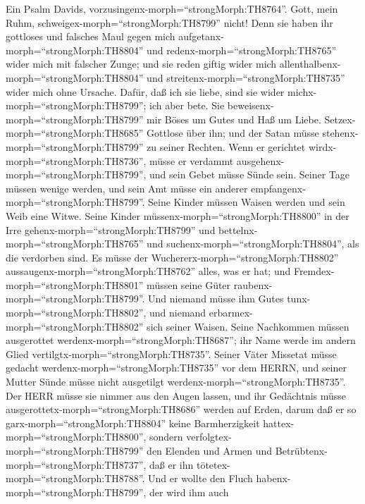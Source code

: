  Ein Psalm Davids,
vorzusingenx-morph=``strongMorph:TH8764''. Gott, mein Ruhm,
schweigex-morph=``strongMorph:TH8799'' nicht!  Denn sie
haben ihr gottloses und falsches Maul gegen mich
aufgetanx-morph=``strongMorph:TH8804'' und
redenx-morph=``strongMorph:TH8765'' wider mich mit falscher Zunge;
 und sie reden giftig wider mich
allenthalbenx-morph=``strongMorph:TH8804'' und
streitenx-morph=``strongMorph:TH8735'' wider mich ohne Ursache.
 Dafür, daß ich sie liebe, sind sie wider
michx-morph=``strongMorph:TH8799''; ich aber bete.  Sie
beweisenx-morph=``strongMorph:TH8799'' mir Böses um Gutes und Haß um
Liebe.  Setzex-morph=``strongMorph:TH8685'' Gottlose über
ihn; und der Satan müsse stehenx-morph=``strongMorph:TH8799'' zu seiner
Rechten.  Wenn er gerichtet
wirdx-morph=``strongMorph:TH8736'', müsse er verdammt
ausgehenx-morph=``strongMorph:TH8799'', und sein Gebet müsse Sünde sein.
 Seiner Tage müssen wenige werden, und sein Amt müsse ein
anderer empfangenx-morph=``strongMorph:TH8799''.  Seine
Kinder müssen Waisen werden und sein Weib eine Witwe. 
Seine Kinder müssenx-morph=``strongMorph:TH8800'' in der Irre
gehenx-morph=``strongMorph:TH8799'' und
bettelnx-morph=``strongMorph:TH8765'' und
suchenx-morph=``strongMorph:TH8804'', als die verdorben sind.
 Es müsse der Wuchererx-morph=``strongMorph:TH8802''
aussaugenx-morph=``strongMorph:TH8762'' alles, was er hat; und
Fremdex-morph=``strongMorph:TH8801'' müssen seine Güter
raubenx-morph=``strongMorph:TH8799''.  Und niemand müsse
ihm Gutes tunx-morph=``strongMorph:TH8802'', und niemand
erbarmex-morph=``strongMorph:TH8802'' sich seiner Waisen. 
Seine Nachkommen müssen ausgerottet
werdenx-morph=``strongMorph:TH8687''; ihr Name werde im andern Glied
vertilgtx-morph=``strongMorph:TH8735''.  Seiner Väter
Missetat müsse gedacht werdenx-morph=``strongMorph:TH8735'' vor dem
HERRN, und seiner Mutter Sünde müsse nicht ausgetilgt
werdenx-morph=``strongMorph:TH8735''.  Der HERR müsse sie
nimmer aus den Augen lassen, und ihr Gedächtnis müsse
ausgerottetx-morph=``strongMorph:TH8686'' werden auf Erden,
 darum daß er so garx-morph=``strongMorph:TH8804'' keine
Barmherzigkeit hattex-morph=``strongMorph:TH8800'', sondern
verfolgtex-morph=``strongMorph:TH8799'' den Elenden und Armen und
Betrübtenx-morph=``strongMorph:TH8737'', daß er ihn
tötetex-morph=``strongMorph:TH8788''.  Und er wollte den
Fluch habenx-morph=``strongMorph:TH8799'', der wird ihm auch
